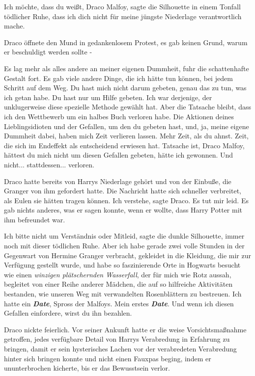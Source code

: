 \glqq Ich möchte, dass du weißt, Draco Malfoy\grqq{}, sagte die Silhouette in
einem Tonfall tödlicher Ruhe, \glqq dass ich dich nicht für meine jüngste
Niederlage verantwortlich mache.\grqq{}

Draco öffnete den Mund in gedankenlosem Protest, es gab keinen Grund, warum er
beschuldigt werden sollte -

\glqq Es lag mehr als alles andere an meiner eigenen Dummheit\grqq{}, fuhr die
schattenhafte Gestalt fort. \glqq Es gab viele andere Dinge, die ich hätte tun
können, bei jedem Schritt auf dem Weg. Du hast mich nicht darum gebeten, genau
das zu tun, was ich getan habe. Du hast nur um Hilfe gebeten. Ich war derjenige,
der unklugerweise diese spezielle Methode gewählt hat. Aber die Tatsache bleibt,
dass ich den Wettbewerb um ein halbes Buch verloren habe. Die Aktionen deines
Lieblingsidioten und der Gefallen, um den du gebeten hast, und, ja, meine eigene
Dummheit dabei, haben mich Zeit verlieren lassen. Mehr Zeit, als du ahnst. Zeit,
die sich im Endeffekt als entscheidend erwiesen hat. Tatsache ist, Draco Malfoy,
hättest du mich nicht um diesen Gefallen gebeten, hätte ich gewonnen. Und
nicht... stattdessen... verloren.\grqq{}

Draco hatte bereits von Harrys Niederlage gehört und von der Einbuße, die
Granger von ihm gefordert hatte. Die Nachricht hatte sich schneller verbreitet,
als Eulen sie hätten tragen können. \glqq Ich verstehe\grqq{}, sagte Draco.
\glqq Es tut mir leid.\grqq{} Es gab nichts anderes, was er sagen konnte, wenn
er wollte, dass Harry Potter mit ihm befreundet war.

\glqq Ich bitte nicht um Verständnis oder Mitleid\grqq{}, sagte die dunkle
Silhouette, immer noch mit dieser tödlichen Ruhe. \glqq Aber ich habe gerade
zwei volle Stunden in der Gegenwart von Hermine Granger verbracht, gekleidet in
die Kleidung, die mir zur Verfügung gestellt wurde, und habe so faszinierende
Orte in Hogwarts besucht wie einen \emph{winzigen plätschernden Wasserfall}, der
für mich wie Rotz aussah, begleitet von einer Reihe anderer Mädchen, die auf so
hilfreiche Aktivitäten bestanden, wie unseren Weg mit verwandelten Rosenblättern
zu bestreuen. Ich hatte ein \textbf{\emph{Date}}, Spross der Malfoys. Mein
erstes \textbf{\emph{Date}}. Und wenn ich diesen Gefallen einfordere, wirst du
ihn bezahlen.\grqq{}

Draco nickte feierlich. Vor seiner Ankunft hatte er die weise Vorsichtsmaßnahme
getroffen, jedes verfügbare Detail von Harrys Verabredung in Erfahrung zu
bringen, damit er sein hysterisches Lachen vor der verabredeten Verabredung
hinter sich bringen konnte und nicht einen Fauxpas beging, indem er
ununterbrochen kicherte, bis er das Bewusstsein verlor.

